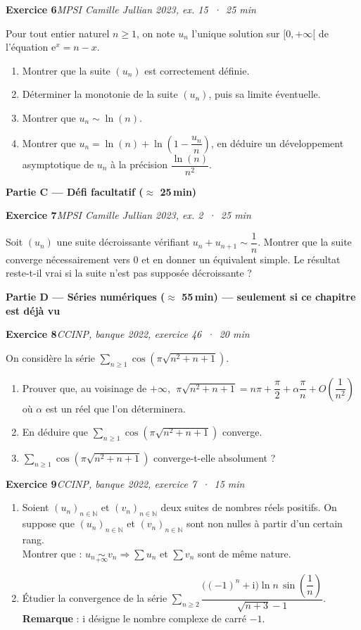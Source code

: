 \documentclass[11pt,a4paper]{article}
\newcommand{\N}{\mathbb{N}}
\newcommand{\ee}{\mathrm{e}}
\newcommand{\exo}[3]{\vspace{1.2em}\noindent\textbf{\large Exercice #1}\hfill\textit{#2 \,·\, #3}\par\smallskip}
\begin{document}
\exo{6}{MPSI Camille Jullian 2023, ex. 15}{25 min}
\noindent Pour tout entier naturel $n\geqslant 1$, on note $u_n$ l'unique solution sur $[0,+\infty[$ de l'\'equation $\ee^x=n-x$.
\begin{enumerate}
\item Montrer que la suite $(u_n)$ est correctement d\'efinie.
\item D\'eterminer la monotonie de la suite $(u_n)$, puis sa limite \'eventuelle.
\item Montrer que $u_n\sim\ln(n)$.
\item Montrer que $u_n=\ln(n)+\ln\!\left(1-\dfrac{u_n}{n}\right)$, en d\'eduire un d\'eveloppement asymptotique de $u_n$ \`a la pr\'ecision $\dfrac{\ln(n)}{n^2}$.
\end{enumerate}

\newpage
\noindent\textbf{Partie C --- D\'efi facultatif (\(\approx\) 25\,min)}

\exo{7}{MPSI Camille Jullian 2023, ex. 2}{25 min}
\noindent Soit $(u_n)$ une suite d\'ecroissante v\'erifiant $u_n+u_{n+1}\sim\dfrac1n$. Montrer que la suite converge n\'ecessairement vers $0$ et en donner un \'equivalent simple. Le r\'esultat reste-t-il vrai si la suite n'est pas suppos\'ee d\'ecroissante ?

\vspace{1.5em}
\noindent\textbf{Partie D --- S\'eries num\'eriques (\(\approx\) 55\,min) --- seulement si ce chapitre est d\'ej\`a vu}

\exo{8}{CCINP, banque 2022, exercice 46}{20 min}
\noindent On consid\`ere la s\'erie $\displaystyle\sum_{n\geqslant 1}\cos\!\left(\pi\sqrt{n^2+n+1}\right)$.
\begin{enumerate}
\item Prouver que, au voisinage de $+\infty$, $\;\pi\sqrt{n^2+n+1}=n\pi+\dfrac{\pi}{2}+\alpha\dfrac{\pi}{n}+O\!\left(\dfrac1{n^2}\right)\;$ o\`u $\alpha$ est un r\'eel que l'on d\'eterminera.
\item En d\'eduire que $\displaystyle\sum_{n\geqslant 1}\cos\!\left(\pi\sqrt{n^2+n+1}\right)$ converge.
\item $\displaystyle\sum_{n\geqslant 1}\cos\!\left(\pi\sqrt{n^2+n+1}\right)$ converge-t-elle absolument ?
\end{enumerate}

\exo{9}{CCINP, banque 2022, exercice 7}{15 min}
\begin{enumerate}
\item Soient $(u_n)_{n\in\N}$ et $(v_n)_{n\in\N}$ deux suites de nombres r\'eels positifs. On suppose que $(u_n)_{n\in\N}$ et $(v_n)_{n\in\N}$ sont non nulles \`a partir d'un certain rang.\\
Montrer que : $u_n \underset{+\infty}{\sim} v_n \Longrightarrow \sum u_n$ et $\sum v_n$ sont de m\^eme nature.
\item \'Etudier la convergence de la s\'erie $\displaystyle\sum_{n\geqslant 2}\dfrac{\big((-1)^n+\mathrm{i}\big)\ln n\,\sin\!\left(\dfrac1n\right)}{\sqrt{n+3}-1}$.\\
\textbf{Remarque} : $\mathrm{i}$ d\'esigne le nombre complexe de carr\'e $-1$.
\end{enumerate}
\end{document}
